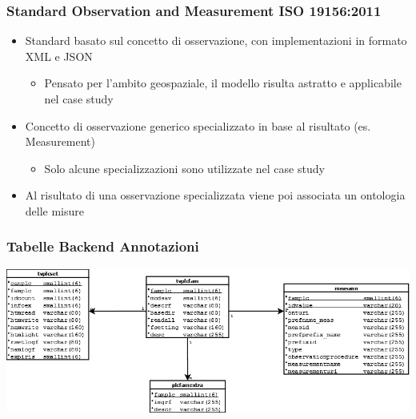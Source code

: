 \documentclass{beamer}
\begin{document}
\begin{frame}
\frametitle{Standard Observation and Measurement ISO 19156:2011}
\begin{itemize}
\item Standard basato sul concetto di osservazione, con implementazioni in formato XML e JSON
\begin{itemize}
\item Pensato per l'ambito geospaziale, il modello risulta astratto e applicabile nel case study
\end{itemize}
\item Concetto di osservazione generico specializzato in base al risultato (es. Measurement)
\begin{itemize}
\item Solo alcune specializzazioni sono utilizzate nel case study
\end{itemize}
\item Al risultato di una osservazione specializzata viene poi associata un ontologia delle misure
\end{itemize}	
\end{frame}

\begin{frame}
\frametitle{Tabelle Backend Annotazioni}
\includegraphics[width=1\textwidth]{images/AltreTabelleAnnotazioniMOD4.png}
\end{frame}



\end{document}
